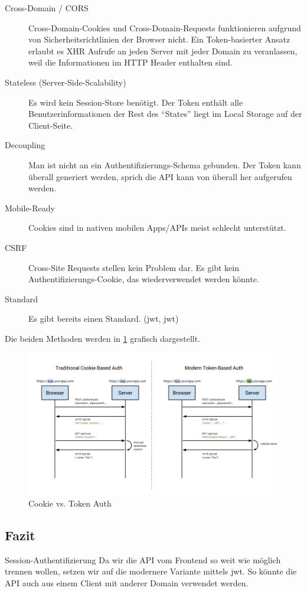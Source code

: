 \begin{description}
  \item[Cross-Domain / CORS]
  Cross-Domain-Cookies und Cross-Domain-Requests funktionieren aufgrund von Sicherheitsrichtlinien der Browser nicht. Ein Token-basierter Ansatz erlaubt es XHR Aufrufe an jeden Server mit jeder Domain zu veranlassen, weil die Informationen im HTTP Header enthalten sind.
  \item[Stateless (Server-Side-Scalability)] Es wird kein Session-Store benötigt. Der Token enthält alle Benutzerinformationen der Rest des ``States'' liegt im Local Storage auf der Client-Seite.
  \item[Decoupling] Man ist nicht an ein Authentifizierungs-Schema gebunden. Der Token kann überall generiert werden, sprich die API kann von überall her aufgerufen werden.
  \item[Mobile-Ready] Cookies sind in nativen mobilen Apps/APIs meist schlecht unterstützt.
  \item[CSRF] Cross-Site Requests stellen kein Problem dar. Es gibt kein Authentifizierungs-Cookie, das wiederverwendet werden könnte.
  \item[Standard] Es gibt bereits einen Standard. (\acl{jwt}, \acs{jwt})
\end{description}
Die beiden Methoden werden in \cref{fig:pd:cookie-token-auth} grafisch dargestellt.
\begin{figure}[H]
    \centering
    \includegraphics[width=\linewidth]{fig/cookie-token-auth}
    \caption{Cookie vs. Token Auth}
    \label{fig:pd:cookie-token-auth}
\end{figure}
\subsection{Fazit}
\begin{decision}{Session-Authentifizierung}
Da wir die API vom Frontend so weit wie möglich trennen wollen, setzen wir auf die modernere Variante mittels \gls{jwt}. So könnte die API auch aus einem Client mit anderer Domain verwendet werden.
\end{decision}
